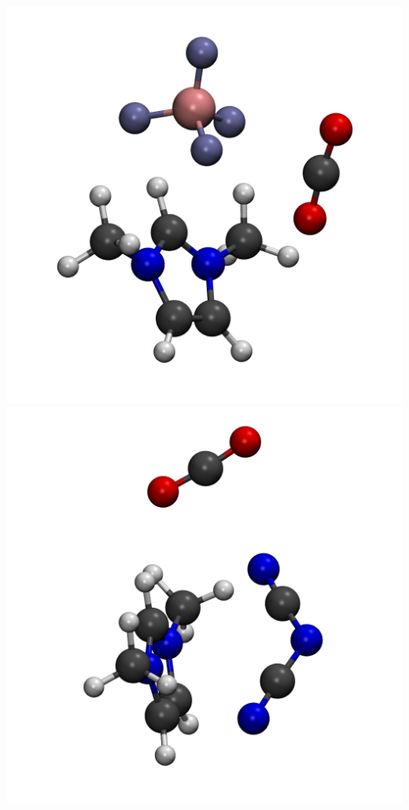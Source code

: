 \documentclass{beamer}
\begin{document}
\begin{frame}
  \includegraphics[scale=0.08]{./figures/cluster_BF4.png}
  \includegraphics[scale=0.08]{./figures/cluster_DCA.png}

\end{frame}
\end{document}
